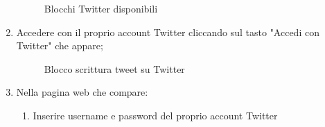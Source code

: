 \begin{enumerate}
\begin{figure}[!ht]
		\caption{Blocchi Twitter disponibili}
	\end{figure}
	\newpage
	\item Accedere con il proprio account Twitter cliccando sul tasto
		"Accedi con Twitter" che appare;
		\begin{figure}[!ht]
			\centering
			\caption{Blocco scrittura tweet su Twitter}
		\end{figure}
	\newpage
	\item Nella pagina web che compare:
	\begin{enumerate}
		\item Inserire username e password del proprio account Twitter

\end{enumerate}
\end{enumerate}
